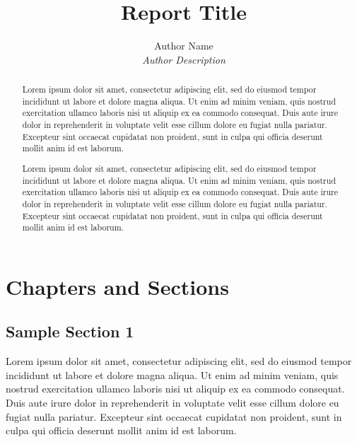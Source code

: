 \documentclass[a4paper, 12pt]{report}
\title{Report Title}
\author{Author Name \\ \textit{Author Description}}
\begin{document}
\maketitle

\begin{abstract}
Lorem ipsum dolor sit amet, consectetur adipiscing elit, sed do eiusmod tempor incididunt ut labore et dolore magna aliqua. Ut enim ad minim veniam, quis nostrud exercitation ullamco laboris nisi ut aliquip ex ea commodo consequat. Duis aute irure dolor in reprehenderit in voluptate velit esse cillum dolore eu fugiat nulla pariatur. Excepteur sint occaecat cupidatat non proident, sunt in culpa qui officia deserunt mollit anim id est laborum.

Lorem ipsum dolor sit amet, consectetur adipiscing elit, sed do eiusmod tempor incididunt ut labore et dolore magna aliqua. Ut enim ad minim veniam, quis nostrud exercitation ullamco laboris nisi ut aliquip ex ea commodo consequat. Duis aute irure dolor in reprehenderit in voluptate velit esse cillum dolore eu fugiat nulla pariatur. Excepteur sint occaecat cupidatat non proident, sunt in culpa qui officia deserunt mollit anim id est laborum.
\end{abstract}

\tableofcontents

\listoffigures

\listoftables

\lstlistoflistings

\newpage
\printglossary[type=\acronymtype]

\chapter{Chapters and Sections}
\section{Sample Section 1}
Lorem ipsum dolor sit amet, consectetur adipiscing elit, sed do eiusmod tempor incididunt ut labore et dolore magna aliqua. Ut enim ad minim veniam, quis nostrud exercitation ullamco laboris nisi ut aliquip ex ea commodo consequat. Duis aute irure dolor in reprehenderit in voluptate velit esse cillum dolore eu fugiat nulla pariatur. Excepteur sint occaecat cupidatat non proident, sunt in culpa qui officia deserunt mollit anim id est laborum.
\end{document}
